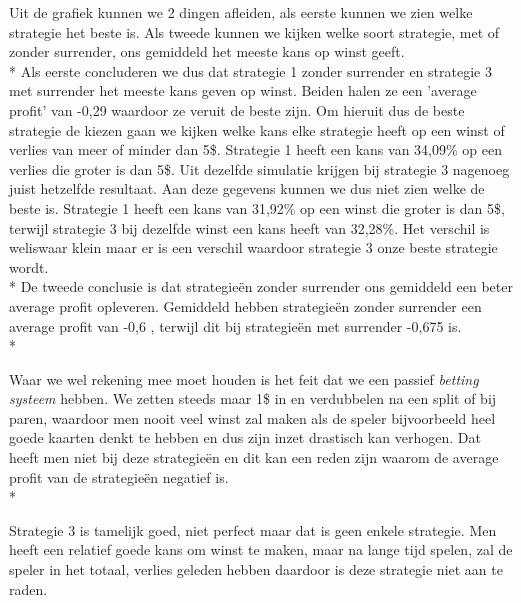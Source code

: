 \documentclass[conference]{IEEEtran}
\begin{document}
Uit de grafiek kunnen we 2 dingen afleiden, als eerste kunnen we zien welke strategie het beste is. Als tweede kunnen we kijken welke soort strategie, met of zonder surrender, ons gemiddeld het meeste kans op winst geeft. \\*
Als eerste concluderen we dus dat strategie 1 zonder surrender en strategie 3 met surrender het meeste kans geven op winst. Beiden halen ze een 'average profit' van -0,29 waardoor ze veruit de beste zijn. Om hieruit dus de beste strategie de kiezen gaan we kijken welke kans elke strategie heeft op een winst of verlies van meer of minder dan 5\$. Strategie 1 heeft een kans van 34,09\% op een verlies die groter is dan 5\$. Uit dezelfde simulatie krijgen bij strategie 3 nagenoeg juist hetzelfde resultaat. Aan deze gegevens kunnen we dus niet zien welke de beste is. Strategie 1 heeft een kans van 31,92\% op een winst die groter is dan 5\$, terwijl strategie 3 bij dezelfde winst een kans heeft van 32,28\%. Het verschil is weliswaar klein maar er is een verschil waardoor strategie 3 onze beste strategie wordt. \\*
De tweede conclusie is dat strategie\"en zonder surrender ons gemiddeld een beter average profit opleveren. Gemiddeld hebben strategie\"en zonder surrender een average profit van -0,6 , terwijl dit bij strategie\"en met surrender -0,675 is. \\*

Waar we wel rekening mee moet houden is het feit dat we een passief \textit{betting systeem} hebben. We zetten steeds maar 1\$ in en verdubbelen na een split of bij paren, waardoor men nooit veel winst zal maken als de speler bijvoorbeeld heel goede kaarten denkt te hebben en dus zijn inzet drastisch kan verhogen. Dat heeft men niet bij deze strategie\"en en dit kan een reden zijn waarom de average profit van de strategie\"en negatief is.\\*

Strategie 3 is tamelijk goed, niet perfect maar dat is geen enkele strategie. Men heeft een relatief goede kans om winst te maken, maar na lange tijd spelen, zal de speler in het totaal, verlies geleden hebben daardoor is deze strategie niet aan te raden. 


\newpage

\nocite{*}
\end{document}

